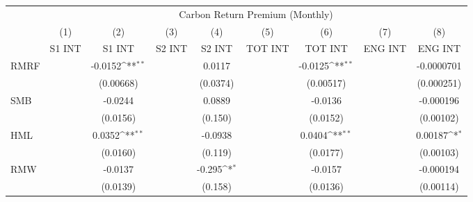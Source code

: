 {
\def\sym#1{\ifmmode^{#1}\else\(^{#1}\)\fi}
\begin{tabular}{l*{8}{c}}
\hline\hline
                    &\multicolumn{8}{c}{Carbon Return Premium (Monthly)}                                                                                                                            \\\cmidrule(lr){2-9}
                    &\multicolumn{1}{c}{(1)}&\multicolumn{1}{c}{(2)}&\multicolumn{1}{c}{(3)}&\multicolumn{1}{c}{(4)}&\multicolumn{1}{c}{(5)}&\multicolumn{1}{c}{(6)}&\multicolumn{1}{c}{(7)}&\multicolumn{1}{c}{(8)}\\
                    &\multicolumn{1}{c}{S1 INT}&\multicolumn{1}{c}{S1 INT}&\multicolumn{1}{c}{S2 INT}&\multicolumn{1}{c}{S2 INT}&\multicolumn{1}{c}{TOT INT}&\multicolumn{1}{c}{TOT INT}&\multicolumn{1}{c}{ENG INT}&\multicolumn{1}{c}{ENG INT}\\
\hline
RMRF                &                     &     -0.0152\sym{**} &                     &      0.0117         &                     &     -0.0125\sym{**} &                     &  -0.0000701         \\
                    &                     &   (0.00668)         &                     &    (0.0374)         &                     &   (0.00517)         &                     &  (0.000251)         \\
SMB                 &                     &     -0.0244         &                     &      0.0889         &                     &     -0.0136         &                     &   -0.000196         \\
                    &                     &    (0.0156)         &                     &     (0.150)         &                     &    (0.0152)         &                     &   (0.00102)         \\
HML                 &                     &      0.0352\sym{**} &                     &     -0.0938         &                     &      0.0404\sym{**} &                     &     0.00187\sym{*}  \\
                    &                     &    (0.0160)         &                     &     (0.119)         &                     &    (0.0177)         &                     &   (0.00103)         \\
RMW                 &                     &     -0.0137         &                     &      -0.295\sym{*}  &                     &     -0.0157         &                     &   -0.000194         \\
                    &                     &    (0.0139)         &                     &     (0.158)         &                     &    (0.0136)         &                     &   (0.00114)         \\

\end{tabular}}
